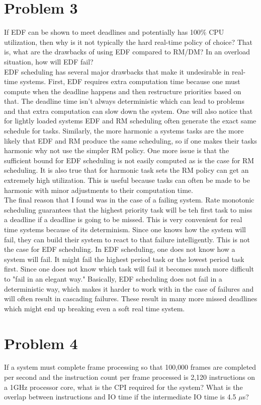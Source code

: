 \documentclass{article}
\begin{document}
\section*{Problem 3}
If EDF can be shown to meet deadlines and potentially has 100\% CPU utilization, then why is it not typically the hard real-time policy of choice? That is, what are the drawbacks of using EDF compared to RM/DM? In an overload situation, how will EDF fail?\\

EDF scheduling has several major drawbacks that make it undesirable in real-time systems. First, EDF requires extra computation time because one must compute when the deadline happens and then restructure priorities based on that. The deadline time isn't always deterministic which can lead to problems and that extra computation can slow down the system. One will also notice that for lightly loaded systems EDF and RM scheduling often generate the exact same schedule for tasks. Similarly,
the more harmonic a systems tasks are the more likely that EDF and RM produce the same scheduling, so if one makes their tasks harmonic why not use the simpler RM policy. One more issue is that the sufficient bound for EDF scheduling is not easily computed as is the case for RM scheduling. It is also true that for harmonic task sets the RM policy can get an extremely high utilization. This is useful because tasks can often be made to be harmonic with minor adjustments to their
computation time.\\

The final reason that I found was in the case of a failing system. Rate monotonic scheduling guarantees that the highest priority task will be teh first task to miss a deadline if a deadline is going to be missed. This is very convenient for real time systems because of its determinism. Since one knows how the system will fail, they can build their system to react to that failure intelligently. This is not the case for EDF scheduling. In EDF scheduling, one does not know how a system will
fail. It might fail the highest period task or the lowest period task first. Since one does not know which task will fail it becomes much more difficult to "fail in an elegant way." Basically, EDF scheduling does not fail in a deterministic way, which makes it harder to work with in the case of failures and will often result in cascading failures. These result in many more missed deadlines which might end up breaking even a soft real time system.

\section*{Problem 4}
If a system must complete frame processing so that 100,000 frames are completed per second and the instruction count per frame processed is 2,120 instructions on a 1GHz processor core, what is the CPI required for the system? What is the overlap between instructions and IO time if the intermediate IO time is 4.5 $\mu$s?\\
\end{document}
